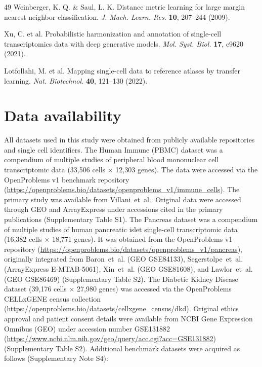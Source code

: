 \documentclass[11pt]{article}
\begin{document}
\begin{thebibliography}{49}
Weinberger, K. Q. \& Saul, L. K. Distance metric learning for large margin nearest neighbor classification. \textit{J. Mach. Learn. Res.} \textbf{10}, 207--244 (2009).

Xu, C. et al. Probabilistic harmonization and annotation of single-cell transcriptomics data with deep generative models. \textit{Mol. Syst. Biol.} \textbf{17}, e9620 (2021).

Lotfollahi, M. et al. Mapping single-cell data to reference atlases by transfer learning. \textit{Nat. Biotechnol.} \textbf{40}, 121--130 (2022).

\end{thebibliography}


\clearpage

\section*{Data availability}

All datasets used in this study were obtained from publicly available repositories and single cell identifiers. The Human Immune (PBMC) dataset was a compendium of multiple studies of peripheral blood mononuclear cell transcriptomic data (33,506 cells $\times$ 12,303 genes). The data were accessed via the OpenProblems v1 benchmark repository (\url{https://openproblems.bio/datasets/openproblems_v1/immune_cells}). The primary study was available from Villani~et~al.\cite{Villani2017Immune}. Original data were accessed through GEO and ArrayExpress under accessions cited in the primary publications (Supplementary Table S1). The Pancreas dataset was a compendium of multiple studies of human pancreatic islet single-cell transcriptomic data (16,382 cells $\times$ 18,771 genes). It was obtained from the OpenProblems v1 repository (\url{https://openproblems.bio/datasets/openproblems_v1/pancreas}), originally integrated from Baron~et~al.\cite{Baron2016Pancreas} (GEO GSE84133), Segerstolpe~et~al.\cite{Segerstolpe2016Pancreas} (ArrayExpress E-MTAB-5061), Xin~et~al.\cite{Xin2016Pancreas} (GEO GSE81608), and Lawlor~et~al.\cite{Lawlor2017Pancreas} (GEO GSE86469) (Supplementary Table S2). The Diabetic Kidney Disease dataset (39,176 cells $\times$ 27,980 genes) was accessed via the OpenProblems CELLxGENE census collection (\url{https://openproblems.bio/datasets/cellxgene_census/dkd}). Original ethics approval and patient consent details were available from NCBI Gene Expression Omnibus (GEO) under accession number GSE131882 (\url{https://www.ncbi.nlm.nih.gov/geo/query/acc.cgi?acc=GSE131882})\cite{Muto2021Kidney} (Supplementary Table S2). Additional benchmark datasets were acquired as follows (Supplementary Note S4):
\end{document}
